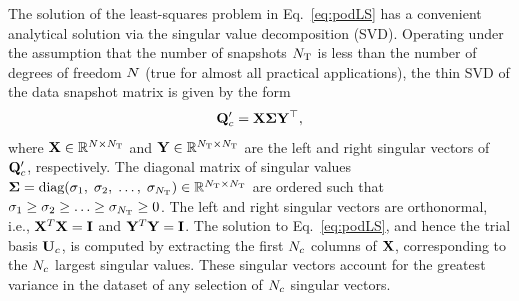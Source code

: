 The solution of the least-squares problem in Eq.~\ref{eq:podLS} has a convenient analytical solution via the singular value decomposition (SVD). Operating under the assumption that the number of snapshots $N_{\text{T}}$ is less than the number of degrees of freedom $N$ (true for almost all practical applications), the thin SVD of the data snapshot matrix is given by the form
\begin{equation}\label{eq:svd}
    \consDataMatUns = \leftEvecMat \singVecMat \rightEvecMat^\top,
\end{equation}
where $\leftEvecMat \inRTwo{\numDOF}{\numSnaps}$ and $\rightEvecMat \inRTwo{\numSnaps}{\numSnaps}$ are the left and right singular vectors of $\consDataMatUns$, respectively. The diagonal matrix of singular values $\boldsymbol{\Sigma} = \text{diag}(\sigma_1, \; \sigma_2, \; \hdots, \; \sigma_{N_{\text{T}}}) \in \mathbb{R}^{N_{\text{T}} \times N_{\text{T}}}$ are ordered such that $\sigma_1 \geq \sigma_2 \geq \hdots \geq \sigma_{N_{\text{T}}} \geq 0 $. The left and right singular vectors are orthonormal, i.e., $\leftEvecMat^T \leftEvecMat = \identMat$ and $\rightEvecMat^T \rightEvecMat = \identMat$. The solution to Eq.~\ref{eq:podLS}, and hence the trial basis $\consTrial$, is computed by extracting the first $N_c$ columns of $\leftEvecMat$, corresponding to the $N_c$ largest singular values. These singular vectors account for the greatest variance in the dataset of any selection of $N_c$ singular vectors.

